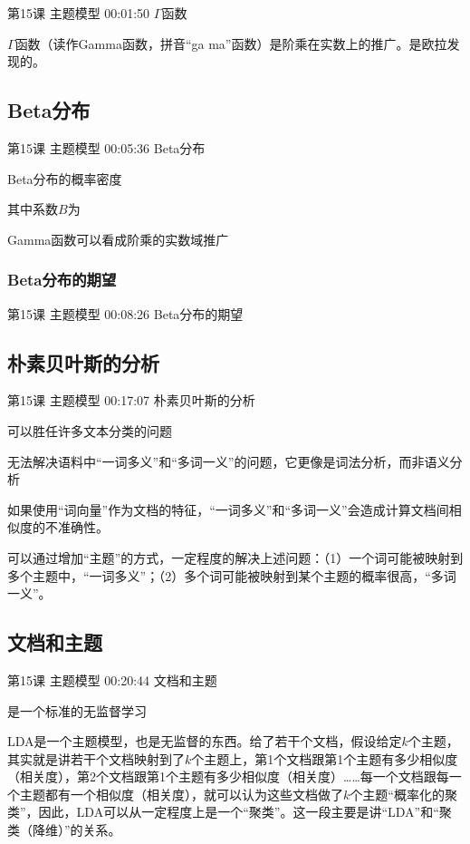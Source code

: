 \documentclass[UTF8]{ctexbook}
\begin{document}
第15课 主题模型 00:01:50 $\Gamma$函数

$\Gamma$函数（读作Gamma函数，拼音“ga ma”函数）是阶乘在实数上的推广。是欧拉发现的。


\subsection{Beta分布}

第15课 主题模型 00:05:36 Beta分布

Beta分布的概率密度

其中系数$B$为

Gamma函数可以看成阶乘的实数域推广

\subsubsection{Beta分布的期望}

第15课 主题模型 00:08:26 Beta分布的期望

\subsection{朴素贝叶斯的分析}

第15课 主题模型 00:17:07 朴素贝叶斯的分析

可以胜任许多文本分类的问题

无法解决语料中“一词多义”和“多词一义”的问题，它更像是词法分析，而非语义分析

如果使用“词向量”作为文档的特征，“一词多义”和“多词一义”会造成计算文档间相似度的不准确性。

可以通过增加“主题”的方式，一定程度的解决上述问题：（1）一个词可能被映射到多个主题中，“一词多义”；（2）多个词可能被映射到某个主题的概率很高，“多词一义”。

\subsection{文档和主题}

第15课 主题模型 00:20:44 文档和主题

是一个标准的无监督学习

LDA是一个主题模型，也是无监督的东西。给了若干个文档，假设给定$k$个主题，其实就是讲若干个文档映射到了$k$个主题上，第1个文档跟第1个主题有多少相似度（相关度），第2个文档跟第1个主题有多少相似度（相关度）……每一个文档跟每一个主题都有一个相似度（相关度），就可以认为这些文档做了$k$个主题“概率化的聚类”，因此，LDA可以从一定程度上是一个“聚类”。这一段主要是讲“LDA”和“聚类（降维）”的关系。
\end{document}
